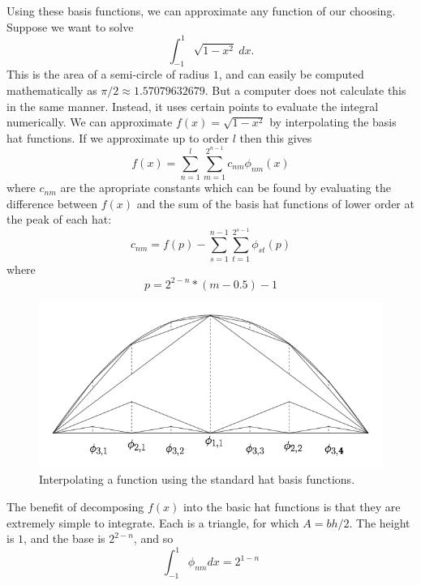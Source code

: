 Using these basis functions, we can approximate any function of our choosing.  Suppose we want to solve
\begin{equation*}
\int_{-1}^{1} \sqrt{1-x^2}\: dx .
\end{equation*}
This is the area of a semi-circle of radius $1$, and can easily be computed mathematically as $\pi / 2 \approx 1.57079632679$.  But a computer does not calculate this in the same manner.  Instead, it uses certain points to evaluate the integral numerically.  We can approximate $f(x) = \sqrt{1-x^2}$ by interpolating the basis hat functions.  If we approximate up to order $l$ then this gives
\begin{equation*}
f(x) = \sum_{n=1}^l \sum_{m=1}^{2^{n-1}} c_{nm} \phi_{nm}(x) 
\end{equation*}
where $c_{nm}$ are the apropriate constants which can be found by evaluating the difference between $f(x)$ and the sum of the basis hat functions of lower order at the peak of each hat:
\begin{equation}
c_{nm} = f(p) - \sum_{s=1}^{n-1} \sum_{t=1}^{2^{s-1}} \phi_{st}(p)
\end{equation}
where
\begin{equation*}
p=2^{2-n}*(m-0.5)-1
\end{equation*}

\begin{center}
\begin{figure}
\includegraphics[width=.7\textwidth]{HB.png}
\caption{Interpolating a function using the standard hat basis functions.}
\label{fig:HB}
\end{figure}
\end{center}

The benefit of decomposing $f(x)$ into the basic hat functions is that they are extremely simple to integrate.  Each is a triangle, for which $A=bh/2$.  The height is $1$, and the base is $2^{2-n}$, and so
\begin{equation*}
\int_{-1}^1 \phi_{nm} dx= 2^{1-n}
\end{equation*}

